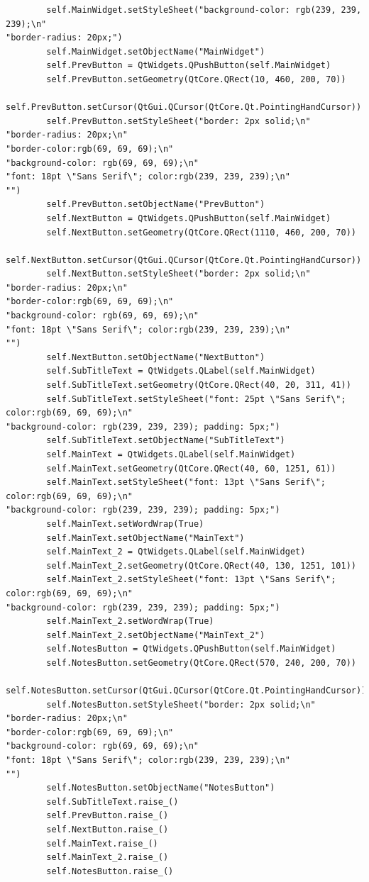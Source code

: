 \documentclass{article}
\begin{document}
\begin{lstlisting}
        self.MainWidget.setStyleSheet("background-color: rgb(239, 239, 239);\n"
"border-radius: 20px;")
        self.MainWidget.setObjectName("MainWidget")
        self.PrevButton = QtWidgets.QPushButton(self.MainWidget)
        self.PrevButton.setGeometry(QtCore.QRect(10, 460, 200, 70))
        self.PrevButton.setCursor(QtGui.QCursor(QtCore.Qt.PointingHandCursor))
        self.PrevButton.setStyleSheet("border: 2px solid;\n"
"border-radius: 20px;\n"
"border-color:rgb(69, 69, 69);\n"
"background-color: rgb(69, 69, 69);\n"
"font: 18pt \"Sans Serif\"; color:rgb(239, 239, 239);\n"
"")
        self.PrevButton.setObjectName("PrevButton")
        self.NextButton = QtWidgets.QPushButton(self.MainWidget)
        self.NextButton.setGeometry(QtCore.QRect(1110, 460, 200, 70))
        self.NextButton.setCursor(QtGui.QCursor(QtCore.Qt.PointingHandCursor))
        self.NextButton.setStyleSheet("border: 2px solid;\n"
"border-radius: 20px;\n"
"border-color:rgb(69, 69, 69);\n"
"background-color: rgb(69, 69, 69);\n"
"font: 18pt \"Sans Serif\"; color:rgb(239, 239, 239);\n"
"")
        self.NextButton.setObjectName("NextButton")
        self.SubTitleText = QtWidgets.QLabel(self.MainWidget)
        self.SubTitleText.setGeometry(QtCore.QRect(40, 20, 311, 41))
        self.SubTitleText.setStyleSheet("font: 25pt \"Sans Serif\"; color:rgb(69, 69, 69);\n"
"background-color: rgb(239, 239, 239); padding: 5px;")
        self.SubTitleText.setObjectName("SubTitleText")
        self.MainText = QtWidgets.QLabel(self.MainWidget)
        self.MainText.setGeometry(QtCore.QRect(40, 60, 1251, 61))
        self.MainText.setStyleSheet("font: 13pt \"Sans Serif\"; color:rgb(69, 69, 69);\n"
"background-color: rgb(239, 239, 239); padding: 5px;")
        self.MainText.setWordWrap(True)
        self.MainText.setObjectName("MainText")
        self.MainText_2 = QtWidgets.QLabel(self.MainWidget)
        self.MainText_2.setGeometry(QtCore.QRect(40, 130, 1251, 101))
        self.MainText_2.setStyleSheet("font: 13pt \"Sans Serif\"; color:rgb(69, 69, 69);\n"
"background-color: rgb(239, 239, 239); padding: 5px;")
        self.MainText_2.setWordWrap(True)
        self.MainText_2.setObjectName("MainText_2")
        self.NotesButton = QtWidgets.QPushButton(self.MainWidget)
        self.NotesButton.setGeometry(QtCore.QRect(570, 240, 200, 70))
        self.NotesButton.setCursor(QtGui.QCursor(QtCore.Qt.PointingHandCursor))
        self.NotesButton.setStyleSheet("border: 2px solid;\n"
"border-radius: 20px;\n"
"border-color:rgb(69, 69, 69);\n"
"background-color: rgb(69, 69, 69);\n"
"font: 18pt \"Sans Serif\"; color:rgb(239, 239, 239);\n"
"")
        self.NotesButton.setObjectName("NotesButton")
        self.SubTitleText.raise_()
        self.PrevButton.raise_()
        self.NextButton.raise_()
        self.MainText.raise_()
        self.MainText_2.raise_()
        self.NotesButton.raise_()


\end{lstlisting}
\end{document}
